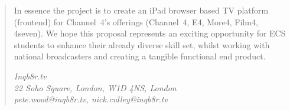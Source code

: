 \begin{quotation}
In essence the project is to create an iPad browser based TV platform (frontend) for Channel~4's offerings (Channel~4, E4, More4, Film4, 4seven). We hope this proposal represents an exciting opportunity for ECS students to enhance their already diverse skill set, whilst working with national broadcasters and creating a tangible functional end product.

\vspace{5 mm}
\begin{centering}
	\textit{Inqb8r.tv}\\
	\textit{22 Soho Square, London, W1D 4NS, London}\\
	\textit{pete.wood@inqb8r.tv, nick.culley@inqb8r.tv}\\
\end{centering}
\end{quotation}